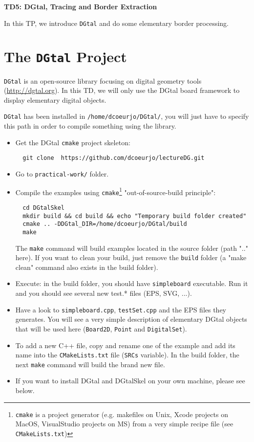 \documentclass[a4paper, 11pt]{article}
\title{}
\author{}
\date{}
\begin{document}
\begin{center}
	\LARGE \textbf{TD5: DGtal, Tracing and Border Extraction}
\end{center}

\bigskip
\par In this TP, we introduce \texttt{DGtal} and do some elementary border processing.

\section*{The \texttt{DGtal} Project}

\par \texttt{DGtal} is an open-source library focusing on digital geometry tools (\url{http://dgtal.org}). In this TD, we will only use the DGtal board framework to display elementary digital objects.

\par \texttt{DGtal} has been installed in \texttt{/home/dcoeurjo/DGtal/}, you will just have to specify this path in order to compile something using the library.
\begin{itemize}
	\item Get the DGtal \texttt{cmake} project skeleton:
\begin{verbatim}
  git clone  https://github.com/dcoeurjo/lectureDG.git
\end{verbatim}
\item Go to \texttt{practical-work/} folder.
	\item Compile the examples using \texttt{cmake}\footnote{\texttt{cmake} is a project generator (e.g. makefiles on Unix, Xcode projects on MacOS, VisualStudio projects on MS) from a very simple recipe file (see \texttt{CMakeLists.txt})} "out-of-source-build principle":
\begin{verbatim}
  cd DGtalSkel
  mkdir build && cd build && echo "Temporary build folder created"
  cmake .. -DDGtal_DIR=/home/dcoeurjo/DGtal/build
  make
\end{verbatim}
	The \texttt{make} command will build examples located in the source folder (path ".." here). If you want to clean your build, just remove the \texttt{build} folder (a "make clean" command also exists in the build folder).
	\item Execute: in the build folder, you should have \texttt{simpleboard} executable. Run it and you should see several new test.* files (EPS, SVG, ...).
	\item Have a look to  \texttt{simpleboard.cpp}, \texttt{testSet.cpp} and the EPS files they generates. You will see a very simple description of elementary DGtal objects that will be used here (\texttt{Board2D}, \texttt{Point} and \texttt{DigitalSet}).
	\item To add a new C++ file, copy and rename one of the example and add its name into the \texttt{CMakeLists.txt} file (\texttt{SRCs} variable). In the build folder, the next \texttt{make} command will build the brand new file.
	\item If you want to install DGtal and DGtalSkel on your own machine, please see below.
\end{itemize}
\end{document}
